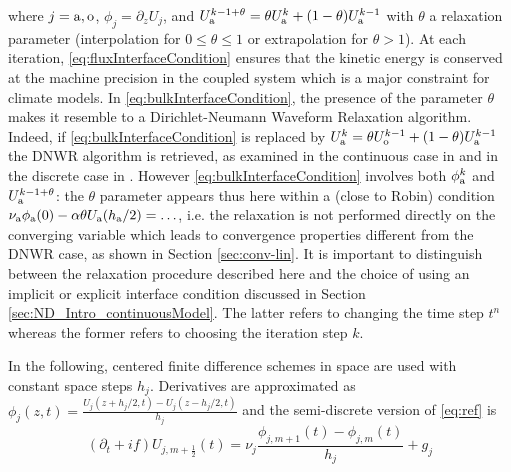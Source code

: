 %
where $j={\rm a},{\rm o}$, $\phi_j = \partial_z U_j$, and 
$U_{\rm a}^{k-1+\theta} = \theta U_{\rm a}^{k} + (1-\theta) U_{\rm a}^{k-1}$
with $\theta$ a relaxation parameter (interpolation for $0\leq \theta \leq 1$ or extrapolation for $\theta>1$). 
%
%
At each iteration, \eqref{eq:fluxInterfaceCondition} ensures that the 
kinetic energy is conserved at the machine precision in the coupled 
system which is a major constraint for climate models. 
In \eqref{eq:bulkInterfaceCondition},
the presence of the parameter $\theta$ makes it resemble to a Dirichlet-Neumann Waveform Relaxation algorithm.
Indeed, if \eqref{eq:bulkInterfaceCondition} is replaced
by $U_{\rm a}^k = \theta U_{\rm o}^{k-1} + (1-\theta) U_{\rm a}^{k-1}$ the DNWR algorithm is retrieved, as examined in the continuous case in \citep{gander_dirichlet-neumann_2016} and in the discrete case in
\citep{meisrimel_time_2020}.
However \eqref{eq:bulkInterfaceCondition}
involves both $\phi_{\rm a}^k$ and 
$U_{\rm a}^{k-1+\theta}$:
the $\theta$ parameter appears thus here within a (close to Robin) condition  
$\nu_{\rm a} \phi_{\rm a}(0) - \alpha \theta U_{\rm a}(h_{\rm a}/2) = \ldots$,
i.e. the relaxation is not performed directly on the converging variable
which leads to convergence properties different from the DNWR case, 
as shown in Section \ref{sec:conv-lin}.
It is important to distinguish between the relaxation
procedure described here and the choice of using an implicit or
explicit interface condition discussed in Section
\ref{sec:ND_Intro_continuousModel}.
The latter refers to changing the time step $t^n$ whereas the former
refers to choosing the iteration step $k$.
\par
%
In the following, centered finite difference schemes in space are used with constant space steps $h_j$.
Derivatives are approximated as $\phi_j(z,t) = \frac{U_j(z+h_j/2,t) - U_j(z-h_j/2, t)}{h_j}$
and the semi-discrete version of \eqref{eq:ref} is
\begin{equation}\label{eq:spaceTimeScheme}
	(\partial_t + if) U_{j, m+\frac{1}{2}} (t) = \nu_j \frac{\phi_{j,m+1}(t) - \phi_{j,m}(t)}{h_j} + g_j
\end{equation}

